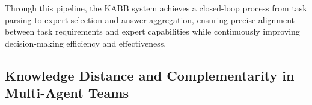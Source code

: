 
Through this pipeline, the KABB system achieves a closed-loop process from task parsing to expert selection and answer aggregation, ensuring precise alignment between task requirements and expert capabilities while continuously improving decision-making efficiency and effectiveness.

\subsection{Knowledge Distance and Complementarity in Multi-Agent Teams}
\label{sec:knowledge_distance}

